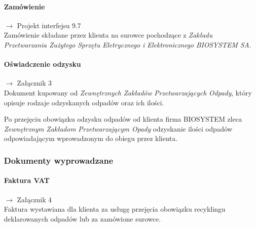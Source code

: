 	\paragraph{Zamówienie} $\rightarrow$ Projekt interfejsu 9.7 \\
	Zamówienie składane przez klienta na surowce pochodzące z \emph{Zakładu Przetwarzania Zużytego Sprzętu Eletrycznego i Elektronicznego BIOSYSTEM SA}.

	\paragraph{Oświadczenie odzysku} $\rightarrow$ Załącznik 3 \\
	Dokument kupowany od \emph{Zewnętrznych Zakładów Przetwarzających Odpady}, który opisuje rodzaje odzyskanych odpadów oraz ich ilości.

	Po przejęciu obowiązku odzysku odpadów od klienta firma BIOSYSTEM zleca \emph{Zewnętrznym Zakładom Przetwarzającym Opady} odzyskanie ilości odpadów odpowiadającym wprowadzonym do obiegu przez klienta.

\subsubsection{Dokumenty wyprowadzane}
	\paragraph{Faktura VAT} $\rightarrow$ Załącznik 4 \\
	Faktura wystawiana dla klienta za usługę przejęcia obowiązku recyklingu deklarowanych odpadów lub za zamówione surowce.